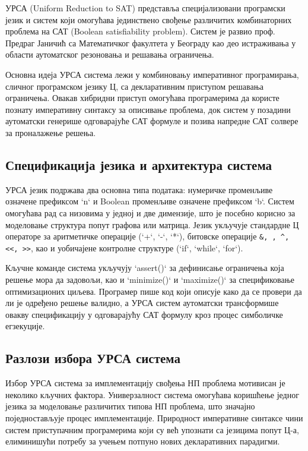\documentclass[12pt,oneside]{memoir}
\begin{document}
УРСА (Uniform Reduction to SAT) представља специјализовани програмски језик и систем који омогућава јединствено свођење различитих комбинаторних проблема на САТ (Boolean satisfiability problem). Систем је развио проф. Предраг Јаничић са Математичког факултета у Београду као део истраживања у области аутоматског резоновања и решавања ограничења.

Основна идеја УРСА система лежи у комбиновању императивног програмирања, сличног програмском језику Ц, са декларативним приступом решавања ограничења. Овакав хибридни приступ омогућава програмерима да користе познату императивну синтаксу за описивање проблема, док систем у позадини аутоматски генерише одговарајуће САТ формуле и позива напредне САТ солвере за проналажење решења.

\subsection{Спецификација језика и архитектура система}

УРСА језик подржава два основна типа података: нумеричке променљиве означене префиксом `n` и Boolean променљиве означене префиксом `b`. Систем омогућава рад са низовима у једној и две димензије, што је посебно корисно за моделовање структура попут графова или матрица. Језик укључује стандардне Ц операторе за аритметичке операције (`+`, `-`, `*`), битовске операције \texttt{\&, \textbar, \^{}, <<, >>}, као и уобичајене контролне структуре (`if`, `while`, `for`).

Кључне команде система укључују `assert()` за дефинисање ограничења која решење мора да задовољи, као и `minimize()` и `maximize()` за спецификовање оптимизационих циљева. Програмер пише код који описује како да се провери да ли је одређено решење валидно, а УРСА систем аутоматски трансформише овакву спецификацију у одговарајућу САТ формулу кроз процес симболичке егзекуције.

\subsection{Разлози избора УРСА система}

Избор УРСА система за имплементацију свођења НП проблема мотивисан је неколико кључних фактора. Универзалност система омогућава коришћење једног језика за моделовање различитих типова НП проблема, што значајно поједностављује процес имплементације. Природност императивне синтаксе чини систем приступачним програмерима који су већ упознати са језицима попут Ц-а, елиминишући потребу за учењем потпуно нових декларативних парадигми.
\end{document}
